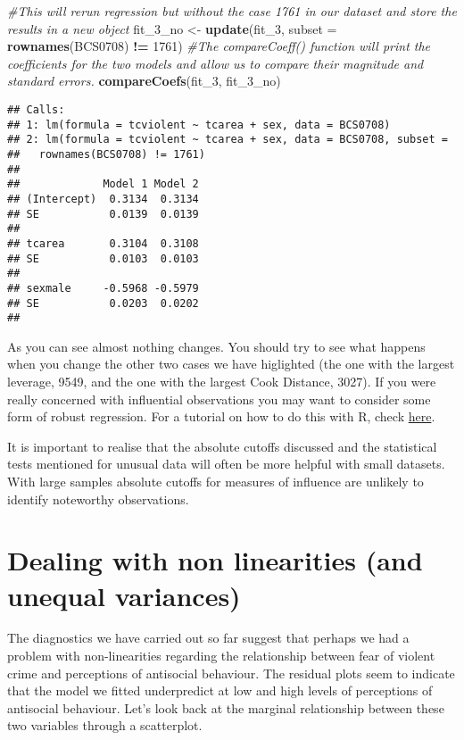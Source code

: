 \documentclass[
]{book}
\newenvironment{Shaded}{\begin{snugshade}}{\end{snugshade}}
\newcommand{\AttributeTok}[1]{\textcolor[rgb]{0.13,0.29,0.53}{#1}}
\newcommand{\CommentTok}[1]{\textcolor[rgb]{0.56,0.35,0.01}{\textit{#1}}}
\newcommand{\DecValTok}[1]{\textcolor[rgb]{0.00,0.00,0.81}{#1}}
\newcommand{\FunctionTok}[1]{\textcolor[rgb]{0.13,0.29,0.53}{\textbf{#1}}}
\newcommand{\NormalTok}[1]{#1}
\newcommand{\OtherTok}[1]{\textcolor[rgb]{0.56,0.35,0.01}{#1}}
\newcommand{\SpecialCharTok}[1]{\textcolor[rgb]{0.81,0.36,0.00}{\textbf{#1}}}
\begin{document}
\begin{Shaded}
\begin{Highlighting}[]
\CommentTok{\#This will rerun regression but without the case 1761 in our dataset and store the results in a new object}
\NormalTok{fit\_3\_no }\OtherTok{\textless{}{-}} \FunctionTok{update}\NormalTok{(fit\_3, }\AttributeTok{subset =} \FunctionTok{rownames}\NormalTok{(BCS0708) }\SpecialCharTok{!=} \DecValTok{1761}\NormalTok{)}
\CommentTok{\#The compareCoeff() function will print the coefficients for the two models and allow us to compare their magnitude and standard errors.}
\FunctionTok{compareCoefs}\NormalTok{(fit\_3, fit\_3\_no)}
\end{Highlighting}
\end{Shaded}

\begin{verbatim}
## Calls:
## 1: lm(formula = tcviolent ~ tcarea + sex, data = BCS0708)
## 2: lm(formula = tcviolent ~ tcarea + sex, data = BCS0708, subset = 
##   rownames(BCS0708) != 1761)
## 
##             Model 1 Model 2
## (Intercept)  0.3134  0.3134
## SE           0.0139  0.0139
##                            
## tcarea       0.3104  0.3108
## SE           0.0103  0.0103
##                            
## sexmale     -0.5968 -0.5979
## SE           0.0203  0.0202
## 
\end{verbatim}

As you can see almost nothing changes. You should try to see what happens when you change the other two cases we have higlighted (the one with the largest leverage, 9549, and the one with the largest Cook Distance, 3027). If you were really concerned with influential observations you may want to consider some form of robust regression. For a tutorial on how to do this with R, check \href{http://www.ats.ucla.edu/stat/r/dae/rreg.htm}{here}.

It is important to realise that the absolute cutoffs discussed and the statistical tests mentioned for unusual data will often be more helpful with small datasets. With large samples absolute cutoffs for measures of influence are unlikely to identify noteworthy observations.

\section{Dealing with non linearities (and unequal variances)}\label{dealing-with-non-linearities-and-unequal-variances}

The diagnostics we have carried out so far suggest that perhaps we had a problem with non-linearities regarding the relationship between fear of violent crime and perceptions of antisocial behaviour. The residual plots seem to indicate that the model we fitted underpredict at low and high levels of perceptions of antisocial behaviour. Let's look back at the marginal relationship between these two variables through a scatterplot.
\end{document}
